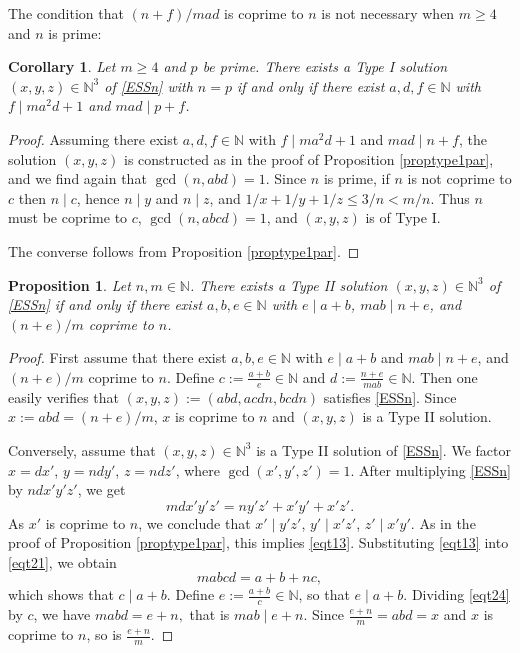 \documentclass[12pt]{amsart}
\newtheorem{corollary}[theorem]{Corollary}
\newtheorem{prop}[theorem]{Proposition}
\theoremstyle{definition}
\theoremstyle{remark}
\numberwithin{equation}{section}
\begin{document}
The condition that $(n+f)/mad$ is coprime to $n$ is not necessary when $m\ge 4$ and $n$ is prime:

\begin{corollary}
\label{corI}
Let $m\ge 4$ and $p$ be prime. 
There exists a Type I solution $(x,y,z)\in \mathbb{N}^3$ of \eqref{ESSn} with $n=p$ if and only if 
there exist $a, d, f \in \mathbb{N}$ with $f\mid ma^2d+1$ and $mad\mid p+f$.
\end{corollary}

\begin{proof}
Assuming there exist $a, d, f \in \mathbb{N}$ with $f\mid ma^2d+1$ and $mad\mid n+f$, the solution $(x,y,z)$ is 
constructed as in the proof of Proposition \ref{proptype1par}, and we find again that $\gcd(n,abd)=1$.
Since $n$ is prime, if $n$ is not coprime to $c$ then $n\mid c$, hence $n\mid y$ and $n\mid z$, and
$1/x+1/y+1/z\le 3/n<m/n$. Thus $n$ must be coprime to $c$, $\gcd(n,abcd)=1$, and $(x,y,z)$ is of Type I.

The converse follows from Proposition \ref{proptype1par}.
\end{proof}


\begin{prop}\label{proptype2par}
Let $n,m \in \mathbb{N}$. There exists a Type II solution $(x,y,z)\in \mathbb{N}^3$ of \eqref{ESSn} if and only if 
there exist $a,b,e \in \mathbb{N}$ with $e\mid a+b$, $mab\mid n+e$, and $(n+e)/m$ coprime to $n$. 
\end{prop}

\begin{proof}
First assume that there exist $a,b,e \in \mathbb{N}$ with $e\mid a+b$ and $mab\mid n+e$, and$(n+e)/m$ coprime to $n$. 
Define $c:=\frac{a+b}{e}\in \mathbb{N}$ and $d:=\frac{n+e}{mab}\in \mathbb{N}$.
Then one easily verifies that $(x,y,z):=(abd,acdn,bcdn)$ satisfies \eqref{ESSn}. 
Since $x:=abd=(n+e)/m$, $x$ is coprime to $n$ and $(x,y,z)$ is a Type II solution.

Conversely, assume that  $(x,y,z)\in \mathbb{N}^3$ is a Type II solution of \eqref{ESSn}.
We factor $x = dx'$, $y = ndy'$, $z = ndz'$, where $\gcd(x',y',z')=1$. After multiplying \eqref{ESSn}
by $ndx'y'z'$, we get
\begin{equation}\label{eqt21}
mdx'y'z' = ny'z' + x'y' + x'z'.
\end{equation}
As $x'$ is coprime to $n$, we conclude that 
$x'\mid y'z'$, $y'\mid x'z'$, $z'\mid x'y'$.
As in the proof of Proposition \ref{proptype1par}, this implies \eqref{eqt13}.
Substituting \eqref{eqt13} into \eqref{eqt21}, we obtain
\begin{equation}\label{eqt24}
mabcd = a+b+nc,
\end{equation}
which shows that $c\mid a+b$. Define $e:=\frac{a+b}{c}\in \mathbb{N}$, so that $e\mid a+b$. Dividing \eqref{eqt24} by $c$, we have 
$mabd = e+n,$
that is $mab\mid e+n$. Since $\frac{e+n}{m}=abd=x$ and $x$ is coprime to $n$, so is $ \frac{e+n}{m}$.
\end{proof}
\end{document}
